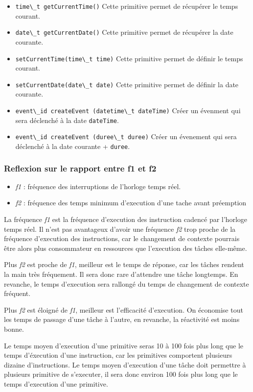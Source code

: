 {
\begin{itemize}

	\item \lstinline {time\_t getCurrentTime()}
	Cette primitive permet de récupérer le temps courant.

	\item \lstinline {date\_t getCurrentDate()}
	Cette primitive permet de récupérer la date courante.

	\item \lstinline {setCurrentTime(time\_t time)}
	Cette primitive permet de définir le temps courant.

	\item \lstinline {setCurrentDate(date\_t date)}
	Cette primitive permet de définir la date courante.

	\item \lstinline {event\_id createEvent (datetime\_t dateTime)}
	Créer un évenment qui sera déclenché à la date \texttt{dateTime}.

	\item \lstinline {event\_id createEvent (duree\_t duree)}
	Créer un évenement qui sera déclenché à la date courante + \texttt{duree}.
\end{itemize}
}
{
\subsubsection{Reflexion sur le rapport entre f1 et f2}

\begin{itemize}
\item \emph{f1} : fréquence des interruptions de l'horloge temps réel.
\item \emph{f2} : fréquence des temps minimum d'execution d'une tache avant préemption
\end{itemize}

La fréquence \emph{f1} est la fréquence d'execution des instruction cadencé par l'horloge temps réel.
Il n'est pas avantageux d'avoir une fréquence \emph{f2} trop proche de la fréquence d'execution des instructions, car le changement de contexte pourrais être alors plus consommateur en ressources que l'execution des tâches elle-même.

Plus \emph{f2} est proche de \emph{f1}, meilleur est le temps de réponse, car les tâches rendent la main très fréquement.
Il sera donc rare d'attendre une tâche longtemps.
En revanche, le temps d'execution sera rallongé du temps de changement de contexte fréquent.

Plus \emph{f2} est éloigné de \emph{f1}, meilleur est l'efficacité d'execution.
On économise tout les temps de passage d'une tâche à l'autre, en revanche, la réactivité est moins bonne.

Le temps moyen d'execution d'une primitive seras 10 à 100 fois plus long que le temps d'éxecution d'une instruction, car les primitives comportent plusieurs dizaine d'instructions.
Le temps moyen d'execution d'une tâche doit permettre à plusieurs primitive de s'executer, il sera donc environ 100 fois plus long que le temps d'execution d'une primitive.
}
